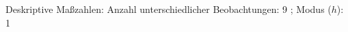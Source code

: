 				\label{tableValues:cstu27e_g3}
				\vspace*{-\baselineskip}
                    \begin{noten}
                	    \note{} Deskriptive Maßzahlen:
                	    Anzahl unterschiedlicher Beobachtungen: 9%
                	    ; 
                	      Modus ($h$): 1
                     \end{noten}


